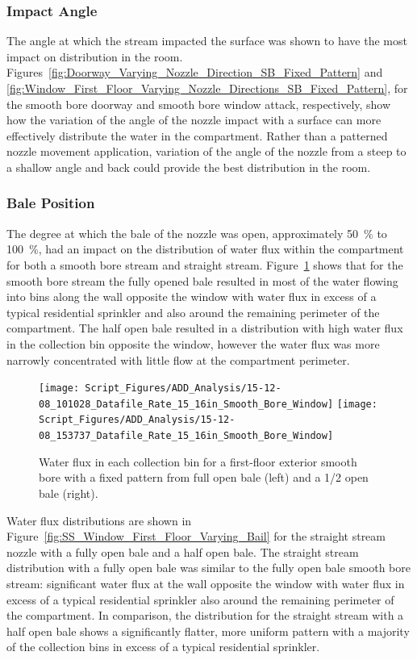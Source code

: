 \documentclass[12pt,oneside]{book}
\begin{document}
\clearpage

\subsubsection{Impact Angle}
The angle at which the stream impacted the surface was shown to have the most impact on distribution in the room. Figures~\ref{fig:Doorway_Varying_Nozzle_Direction_SB_Fixed_Pattern} and \ref{fig:Window_First_Floor_Varying_Nozzle_Directions_SB_Fixed_Pattern}, for the smooth bore doorway and smooth bore window attack, respectively, show how the variation of the angle of the nozzle impact with a surface can more effectively distribute the water in the compartment. Rather than a patterned nozzle movement application, variation of the angle of the nozzle from a steep to a shallow angle and back could provide the best distribution in the room.  

\subsubsection{Bale Position}
The degree at which the bale of the nozzle was open, approximately 50~\% to 100~\%, had an impact on the distribution of water flux within the compartment for both a smooth bore stream and straight stream. Figure~\ref{fig:SB_Window_First_Floor_Varying_Bail} shows that for the smooth bore stream the fully opened bale resulted in most of the water flowing into bins along the wall opposite the window with water flux in excess of a typical residential sprinkler and also around the remaining perimeter of the compartment. The half open bale resulted in a distribution with high water flux in the collection bin opposite the window, however the water flux was more narrowly concentrated with little flow at the compartment perimeter. 

\begin{figure}[ht]
\texttt{[image: Script\_Figures/ADD\_Analysis/15-12-08\_101028\_Datafile\_Rate\_15\_16in\_Smooth\_Bore\_Window]}
\texttt{[image: Script\_Figures/ADD\_Analysis/15-12-08\_153737\_Datafile\_Rate\_15\_16in\_Smooth\_Bore\_Window]} \\ 
\caption[Water Flux Varying Bale Opening Smooth Bore]{Water flux in each collection bin for a first-floor exterior smooth bore with a fixed pattern from full open bale (left) and a 1/2 open bale (right).}
\label{fig:SB_Window_First_Floor_Varying_Bail}
\end{figure}

Water flux distributions are shown in Figure~\ref{fig:SS_Window_First_Floor_Varying_Bail} for the straight stream nozzle with a fully open bale and a half open bale. The straight stream distribution with a fully open bale was similar to the fully open bale smooth bore stream: significant water flux at the wall opposite the window with water flux in excess of a typical residential sprinkler also around the remaining perimeter of the compartment. In comparison, the distribution for the straight stream with a half open bale shows a significantly flatter, more uniform pattern with a majority of the collection bins in excess of a typical residential sprinkler.
\end{document}
